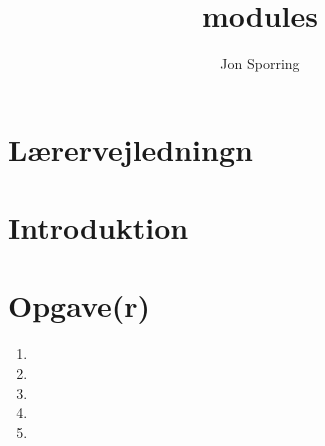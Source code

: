 \documentclass[a4paper,12pt]{article}
\title{modules}
\author{Jon Sporring}
\begin{document}
\maketitle

\section{Lærervejledningn}

\section{Introduktion}

\section{Opgave(r)}
\begin{enumerate}
\item 
\item 
\item 
\item 
\item 
\end{enumerate}
\end{document}
